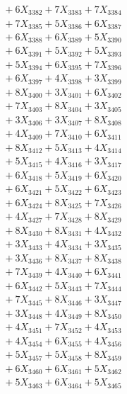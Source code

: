 \documentclass[a4paper,10pt]{article}
\begin{document}
{\begin{align}
&\;  + 6 X_{3382} + 7 X_{3383} + 7 X_{3384} \\[0.3ex]
&\;  + 7 X_{3385} + 5 X_{3386} + 6 X_{3387} \\[0.3ex]
&\;  + 6 X_{3388} + 6 X_{3389} + 5 X_{3390} \\[0.3ex]
&\;  + 6 X_{3391} + 5 X_{3392} + 5 X_{3393} \\[0.3ex]
&\;  + 5 X_{3394} + 6 X_{3395} + 7 X_{3396} \\[0.3ex]
&\;  + 6 X_{3397} + 4 X_{3398} + 3 X_{3399} \\[0.5ex]\allowbreak
&\;  + 8 X_{3400} + 3 X_{3401} + 6 X_{3402} \\[0.3ex]
&\;  + 7 X_{3403} + 8 X_{3404} + 3 X_{3405} \\[0.3ex]
&\;  + 3 X_{3406} + 3 X_{3407} + 8 X_{3408} \\[0.3ex]
&\;  + 4 X_{3409} + 7 X_{3410} + 6 X_{3411} \\[0.3ex]
&\;  + 8 X_{3412} + 5 X_{3413} + 4 X_{3414} \\[0.3ex]
&\;  + 5 X_{3415} + 4 X_{3416} + 3 X_{3417} \\[0.3ex]
&\;  + 6 X_{3418} + 5 X_{3419} + 6 X_{3420} \\[0.3ex]
&\;  + 6 X_{3421} + 5 X_{3422} + 6 X_{3423} \\[0.3ex]
&\;  + 6 X_{3424} + 8 X_{3425} + 7 X_{3426} \\[0.3ex]
&\;  + 4 X_{3427} + 7 X_{3428} + 8 X_{3429} \\[0.5ex]\allowbreak
&\;  + 8 X_{3430} + 8 X_{3431} + 4 X_{3432} \\[0.3ex]
&\;  + 3 X_{3433} + 4 X_{3434} + 3 X_{3435} \\[0.3ex]
&\;  + 3 X_{3436} + 8 X_{3437} + 8 X_{3438} \\[0.3ex]
&\;  + 7 X_{3439} + 4 X_{3440} + 6 X_{3441} \\[0.3ex]
&\;  + 6 X_{3442} + 5 X_{3443} + 7 X_{3444} \\[0.3ex]
&\;  + 7 X_{3445} + 8 X_{3446} + 3 X_{3447} \\[0.3ex]
&\;  + 3 X_{3448} + 4 X_{3449} + 8 X_{3450} \\[0.3ex]
&\;  + 4 X_{3451} + 7 X_{3452} + 4 X_{3453} \\[0.3ex]
&\;  + 4 X_{3454} + 6 X_{3455} + 4 X_{3456} \\[0.3ex]
&\;  + 5 X_{3457} + 5 X_{3458} + 8 X_{3459} \\[0.5ex]\allowbreak
&\;  + 6 X_{3460} + 6 X_{3461} + 5 X_{3462} \\[0.3ex]
&\;  + 5 X_{3463} + 6 X_{3464} + 5 X_{3465} \\[0.3ex]

\end{align}}
\end{document}

